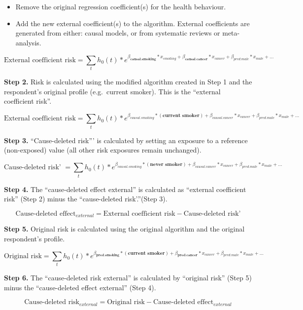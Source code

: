 \documentclass[]{book}
\providecommand{\tightlist}{%
  \setlength{\itemsep}{0pt}\setlength{\parskip}{0pt}}
\begin{document}
\begin{itemize}
\tightlist
\item
  Remove the original regression coefficient(s) for the health
  behaviour.
\item
  Add the new external coefficient(s) to the algorithm. External
  coefficients are generated from either: causal models, or from
  systematic reviews or meta-analysis.
\end{itemize}

\[ \text{External coefficient risk} = \sum_t h_0(t) * e^{{\beta_\textbf{causal.smoking}}*x_{smoking} + {{\beta_\textbf{causal.cancer}}}*x_{cancer} + \beta_{pred.male}*x_{male} +...}  \]

\textbf{Step 2.} Risk is calculated using the modified algorithm created
in Step 1 and the respondent's original profile (e.g.~current smoker).
This is the ``external coefficient risk''.

\[ \text{External coefficient risk} = \sum_t h_0(t) * e^{\beta_{causal.smoking}* {(\textbf{current smoker})} + \beta_{causal.cancer}*x_{cancer} + \beta_{pred.male}*x_{male} +...}  \]

\textbf{Step 3.} ``Cause-deleted risk''' is calculated by setting an
exposure to a reference (non-exposed) value (all other risk exposures
remain unchanged).

\[ \text{Cause-deleted risk' } = \sum_t h_0(t) * e^{\beta_{causal.smoking}* {(\textbf{never smoker})} + \beta_{causal.cancer}*x_{cancer} + \beta_{pred.male}*x_{male} +...}  \]

\textbf{Step 4.} The ``cause-deleted effect external'' is calculated as
``external coefficient risk'' (Step 2) minus the ``cause-deleted
risk'.''(Step 3).

\[\text{Cause-deleted effect}_{external} = \text{External coefficient risk} - \text{Cause-deleted risk'}\]

\textbf{Step 5.} Original risk is calculated using the original
algorithm and the original respondent's profile.

\[ \text{Original risk} = \sum_t h_0(t) * e^{{\beta_\textbf{pred.smoking}}*{(\textbf{current smoker})}+{\beta_\textbf{pred.cancer}}*x_{cancer} + \beta_{pred.male}*x_{male} +...}  \]

\textbf{Step 6.} The ``cause-deleted risk external'' is calculated by
``original risk'' (Step 5) minus the ``cause-deleted effect external''
(Step 4).

\[\text{Cause-deleted risk}_{ external} = \text{Original risk} - \text{Cause-deleted effect}_{external}\]
\end{document}
